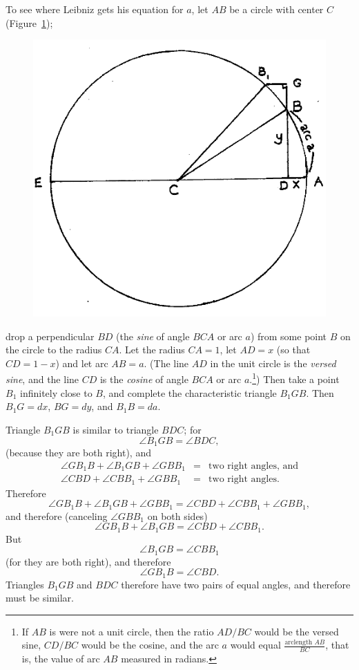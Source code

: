 \documentclass[twoside,openright]{article}
\begin{document}
To see where Leibniz gets his equation for $a$, let $AB$ be a circle with center $C$ (Figure~\ref{circarc});
\begin{figure}[htp]
\begin{center}
\includegraphics[width=.65\textwidth]{fig/Figure42}
\caption{}
\label{circarc}
\vspace{-10pt}
\end{center}
\end{figure} 
drop a perpendicular $BD$ (the {\em sine} of angle $BCA$ or arc
$a$) from some point $B$ on the circle to the radius $CA$.  Let the
radius $CA=1$, let $AD = x$ (so that $CD = 1-x$) and let arc $AB = a$.
(The line $AD$ in the unit circle is the {\em versed sine}, and the
line $CD$ is the {\em cosine} of angle $BCA$ or arc $a$.\footnote{If
  $AB$ is were not a unit circle, then the ratio $AD/BC$ would be the
  versed sine, $CD/BC$ would be the cosine, and the arc $a$ would
  equal $\displaystyle \frac{\text{arclength }AB}{BC}$, that is, the
  value of arc $AB$ measured in radians.}) Then take a point $B_1$
infinitely close to $B$, and complete the characteristic triangle
$B_1GB$.  Then $B_1G=dx$,\label{b1gpositive} $BG = dy$, and
$B_1B = da$.

Triangle $B_1GB$ is similar to triangle $BDC$; for 
$$\angle B_1GB = \angle BDC,$$
(because they are both right), and
\begin{eqnarray*}
\angle GB_1B + \angle B_1GB + \angle GBB_1 & = & \mbox{two right angles, and}\\
\angle CBD + \angle CBB_1 + \angle GBB_1 & = & \mbox{two right angles.}
\end{eqnarray*}
Therefore 
$$\angle GB_1B + \angle B_1GB + \angle GBB_1 = \angle CBD + \angle CBB_1 + \angle GBB_1, $$
and therefore (canceling $\angle GBB_1$ on both sides)
$$\angle GB_1B + \angle B_1GB  = \angle CBD + \angle CBB_1. $$
But 
$$\angle B_1GB = \angle CBB_1$$
(for they are both right), and therefore
$$\angle GB_1B = \angle CBD.$$
Triangles $B_1GB$ and $BDC$ therefore have two pairs of equal angles, and therefore must be similar.
\end{document}
